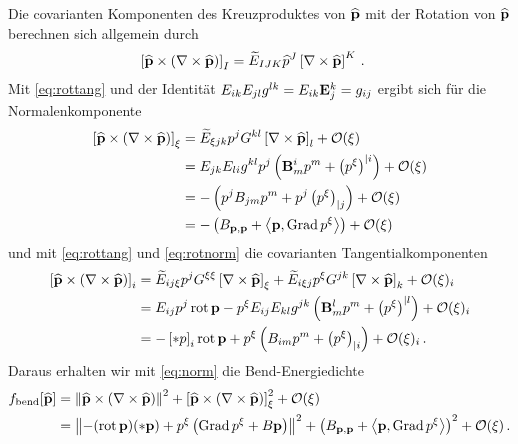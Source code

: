 \documentclass[a4paper,11pt]{scrartcl}
\newcommand{\landau}{\mathcal{O}}
\begin{document}
Die covarianten Komponenten des Kreuzproduktes von \( \widehat{\mathbf{p}} \) mit der Rotation von \( \widehat{\mathbf{p}} \) berechnen sich allgemein durch
\begin{align}
  \left[ \widehat{\mathbf{p}}\times\left( \nabla \times \widehat{\mathbf{p}} \right) \right]_{I}
    &= \widetilde{E}_{IJK} \widehat{p}^{J} \left[ \nabla \times \widehat{\mathbf{p}} \right]^{K} \,\text{.}
\end{align}
Mit \eqref{eq:rottang} und der Identität 
\( E_{ik}E_{jl}g^{lk} = E_{ik}\mathbf{E}{_{j}^{k}} = g_{ij} \)
ergibt sich für die Normalenkomponente
\begin{align}
  \left[ \pExt\times\left( \nabla \times \pExt \right) \right]_{\xi}
    &= \widetilde{E}_{\xi j k} p^{j} G^{kl} \left[ \nabla \times \pExt \right]_{l} + \landau(\xi) \\
    &= E_{jk}E_{li}g^{kl}p^{j}\left( \tensor{B}{^{i}_{m}}p^{m} + \left( p^{\xi} \right)^{|i} \right) + \landau(\xi) \\
    &= -\left( p^{j}B_{jm}p^{m} + p^{j}\left( p^{\xi} \right)_{|j} \right) + \landau(\xi) \\
    &= -\left( B_{\pb,\pb} + \left\langle \pb, \Grad p^{\xi} \right\rangle\right) + \landau(\xi)
\end{align}
und mit \eqref{eq:rottang} und \eqref{eq:rotnorm} die covarianten Tangentialkomponenten
\begin{align}
  \left[ \pExt\times\left( \nabla \times \pExt \right) \right]_{i}
    &= \widetilde{E}_{i j \xi} p^{j} G^{\xi\xi} \left[ \nabla \times \pExt \right]_{\xi}
        + \widetilde{E}_{i \xi j} p^{\xi} G^{jk} \left[ \nabla \times \pExt \right]_{k} + \landau(\xi)_{i} \\
    &= E_{ij}p^{j}\rot\pb - p^{\xi}E_{ij}E_{kl}g^{jk}\left( \tensor{B}{^{l}_{m}}p^{m} + \left( p^{\xi} \right)^{|l} \right) + \landau(\xi)_{i} \\
    &= -\left[ *p \right]_{i} \rot\pb + p^{\xi}\left( B_{im}p^{m} + \left(p^{\xi} \right)_{|i} \right) + \landau(\xi)_{i}
    \formPeriod
\end{align}
Daraus erhalten wir mit \eqref{eq:norm} die Bend-Energiedichte
\begin{align}
   f_{\text{bend}}[\pExt] &= \left\| \pExt\times\left( \nabla \times \pExt \right) \right\|^{2}
                            + \left[ \pExt\times\left( \nabla \times \pExt \right) \right]_{\xi}^{2} + \landau(\xi) \\
                          &= \left\| -(\rot\pb)(*\pb) + p^{\xi}\left( \Grad p^{\xi} + B\pb \right) \right\|^{2}
                              + \left( B_{\pb,\pb} + \left\langle \pb, \Grad p^{\xi} \right\rangle\right)^{2} + \landau(\xi)
                                \formPeriod
\end{align}
\end{document}
